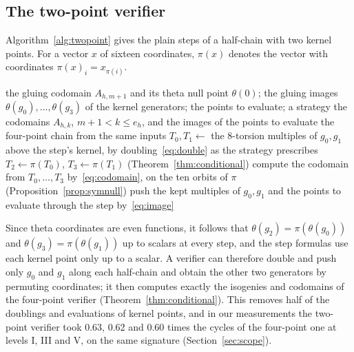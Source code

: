 \documentclass[version=preprint]{iacrcc}
\begin{document}
    \subsection{The two-point verifier}
    \label{sec:twopoint-alg}
    Algorithm~\ref{alg:twopoint} gives the plain steps of a half-chain with
    two kernel points. For a vector $x$ of sixteen coordinates, $\pi(x)$
    denotes the vector with coordinates $\pi(x)_i = x_{\pi(i)}$.

    \begin{algorithm}[t]
        \caption{The plain steps of a half-chain with two kernel points.}
        \label{alg:twopoint}
        \begin{algorithmic}[1]
            \Require the gluing codomain $A_{h,m+1}$ and its theta null point
            $\theta(0)$; the gluing images $\theta(g_0), \ldots, \theta(g_3)$ of
            the kernel generators; the points to evaluate; a strategy
            \Ensure the codomains $A_{h,k}$, $m + 1 < k \le e_h$, and the images
            of the points to evaluate
                \State \Return the four-point chain from the same inputs
            \EndIf
                \State $T_0, T_1 \gets$ the 8-torsion multiples of $g_0, g_1$
                above the step's kernel, by doubling~\eqref{eq:double} as the
                strategy prescribes
                \State $T_2 \gets \pi(T_0)$, $T_3 \gets \pi(T_1)$
                (Theorem~\ref{thm:conditional})
                \State compute the codomain from $T_0, \ldots, T_3$
                by~\eqref{eq:codomain}, on the ten orbits of $\pi$
                (Proposition~\ref{prop:symnull})
                \State push the kept multiples of $g_0, g_1$ and the points to
                evaluate through the step by~\eqref{eq:image}
            \EndFor
        \end{algorithmic}
    \end{algorithm}

    Since theta coordinates are even functions, it follows that $\theta(g_2)
    = \pi(\theta(g_0))$ and $\theta(g_3) = \pi(\theta(g_1))$ up to scalars at
    every step, and the step formulas use each kernel point only up to a
    scalar. A verifier can therefore double and push only $g_0$ and $g_1$
    along each half-chain and obtain the other two generators by permuting
    coordinates; it then computes exactly the isogenies and codomains of the
    four-point verifier (Theorem~\ref{thm:conditional}). This removes half of
    the doublings and evaluations of kernel points, and in our measurements
    the two-point verifier took 0.63, 0.62 and 0.60 times the cycles of the four-point one at levels I, III and V, on
    the same signature (Section~\ref{sec:scope}).
\end{document}
